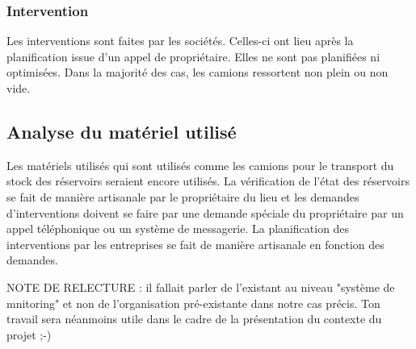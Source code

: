 \subsubsection{Intervention}

Les interventions sont faites par les sociétés. Celles-ci ont lieu après la planification issue d'un appel de propriétaire. Elles ne sont pas planifiées ni optimisées. Dans la majorité des cas, les camions ressortent non plein ou non vide.

\subsection{Analyse du matériel utilisé}

Les matériels utilisés qui sont utilisés comme les camions pour le transport du stock des réservoirs seraient encore utilisés. La vérification de l'état des réservoirs se fait de manière artisanale par le propriétaire du lieu et les demandes d'interventions doivent se faire par une demande spéciale du propriétaire par un appel téléphonique ou un système de messagerie. La planification des interventions par les entreprises se fait de manière artisanale en fonction des demandes.



NOTE DE RELECTURE : il fallait parler de l'existant au niveau "système de
mnitoring" et non de l'organisation pré-existante dans notre cas précis.
Ton travail sera néanmoins utile dans le cadre de la présentation du
contexte du projet ;-)
